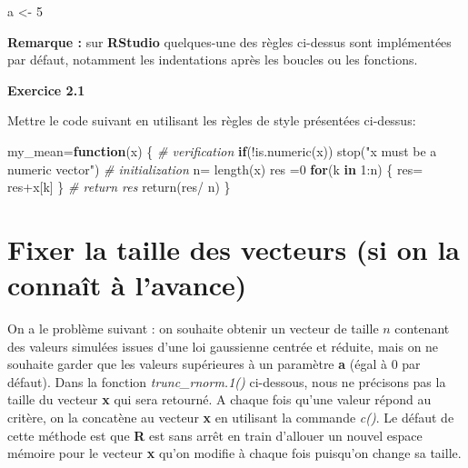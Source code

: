 \documentclass[
]{book}
\newenvironment{Shaded}{\begin{snugshade}}{\end{snugshade}}
\newcommand{\CommentTok}[1]{\textcolor[rgb]{0.56,0.35,0.01}{\textit{#1}}}
\newcommand{\ControlFlowTok}[1]{\textcolor[rgb]{0.13,0.29,0.53}{\textbf{#1}}}
\newcommand{\DecValTok}[1]{\textcolor[rgb]{0.00,0.00,0.81}{#1}}
\newcommand{\FunctionTok}[1]{\textcolor[rgb]{0.00,0.00,0.00}{#1}}
\newcommand{\NormalTok}[1]{#1}
\newcommand{\OtherTok}[1]{\textcolor[rgb]{0.56,0.35,0.01}{#1}}
\newcommand{\SpecialCharTok}[1]{\textcolor[rgb]{0.00,0.00,0.00}{#1}}
\newcommand{\StringTok}[1]{\textcolor[rgb]{0.31,0.60,0.02}{#1}}
\theoremstyle{definition}
\theoremstyle{definition}
\theoremstyle{definition}
\theoremstyle{definition}
\theoremstyle{remark}
\begin{document}
\begin{Shaded}
\begin{Highlighting}[]
\NormalTok{a }\OtherTok{\textless{}{-}} \DecValTok{5}
\end{Highlighting}
\end{Shaded}

\textbf{Remarque :} sur \textbf{RStudio} quelques-une des règles ci-dessus sont implémentées par défaut, notamment les indentations après les boucles ou les fonctions.

\textbf{Exercice 2.1}

Mettre le code suivant en utilisant les règles de style présentées ci-dessus:

\begin{Shaded}
\begin{Highlighting}[]
\NormalTok{my\_mean}\OtherTok{=}\ControlFlowTok{function}\NormalTok{(x)}
\NormalTok{\{}
\CommentTok{\# verification}
\ControlFlowTok{if}\NormalTok{(}\SpecialCharTok{!}\FunctionTok{is.numeric}\NormalTok{(x))}
  \FunctionTok{stop}\NormalTok{(}\StringTok{"x must be a numeric vector"}\NormalTok{)}
\CommentTok{\# initialization}
\NormalTok{n}\OtherTok{=} \FunctionTok{length}\NormalTok{(x) }
\NormalTok{res }\OtherTok{=}\DecValTok{0}
\ControlFlowTok{for}\NormalTok{(k }\ControlFlowTok{in} \DecValTok{1}\SpecialCharTok{:}\NormalTok{n) }
\NormalTok{\{}
\NormalTok{  res}\OtherTok{=}\NormalTok{ res}\SpecialCharTok{+}\NormalTok{x[k]}
\NormalTok{\}}
\CommentTok{\# return res}
  \FunctionTok{return}\NormalTok{(res}\SpecialCharTok{/}\NormalTok{ n)}
\NormalTok{\}  }
\end{Highlighting}
\end{Shaded}

\hypertarget{fixer-la-taille-des-vecteurs-si-on-la-connauxeet-uxe0-lavance}{%
\section{Fixer la taille des vecteurs (si on la connaît à l'avance)}\label{fixer-la-taille-des-vecteurs-si-on-la-connauxeet-uxe0-lavance}}

On a le problème suivant : on souhaite obtenir un vecteur de taille \(n\) contenant des valeurs simulées issues d'une loi gaussienne centrée et réduite, mais on ne souhaite garder que les valeurs supérieures à un paramètre \textbf{a} (égal à 0 par défaut). Dans la fonction \emph{trunc\_rnorm.1()} ci-dessous, nous ne précisons pas la taille du vecteur \textbf{x} qui sera retourné. A chaque fois qu'une valeur répond au critère, on la concatène au vecteur \textbf{x} en utilisant la commande \emph{c()}. Le défaut de cette méthode est que \textbf{R} est sans arrêt en train d'allouer un nouvel espace mémoire pour le vecteur \textbf{x} qu'on modifie à chaque fois puisqu'on change sa taille.
\end{document}

